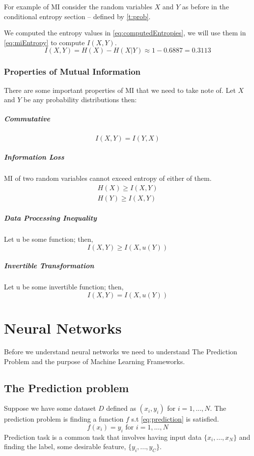 \documentclass[dissertation.tex]{subfiles}
\begin{document}
For example of MI consider the random variables $X$ and $Y$ as
before in the conditional entropy section -- defined by \autoref{t:prob}. 

We computed the entropy values in \autoref{eq:computedEntropies}, we will use
them in \autoref{eq:miEntropy} to compute $I(X,Y)$.
\begin{equation}
  I(X,Y) = H(X) - H(X|Y) \approx 1 - 0.6887 = 0.3113
\end{equation}

\subsubsection{Properties of Mutual Information}
There are some important properties of MI that we need to take note of. Let $X$
and $Y$ be any probability distributions then:

\subparagraph{Commutative} 
\begin{equation}
  I(X,Y) = I(Y, X)
\end{equation}
\subparagraph{Information Loss} MI of two random variables cannot exceed entropy
of either of them.
\begin{align}
  H(X) \geq I(X,Y) \nonumber \\
  H(Y) \geq I(X,Y)
  \label{eq:MIloss}
\end{align}
\subparagraph{Data Processing Inequality} Let u be some function; then,
\begin{equation}
  I(X,Y) \geq I(X, u(Y))
\end{equation}
\subparagraph{Invertible Transformation} Let u be some invertible function;
then,
\begin{equation}
  I(X, Y) = I(X, u(Y))
\end{equation}

\section{Neural Networks}
\label{sec:NN}

Before we understand neural networks we need to understand The Prediction
Problem and the purpose of Machine Learning Frameworks.

\subsection{The Prediction problem} 

Suppose we have some dataset $D$ defined as $(x_i, y_i)$ for $i = 1,...,N$. The
prediction problem is finding a function $f$ s.t \autoref{eq:prediction} is
satisfied.
\begin{equation}
  f(x_i) = y_i \text{ for } i = 1,...,N
  \label{eq:prediction}
\end{equation}
Prediction task is a common task that involves having input data
$\{x_i,...,x_N\}$ and finding the label, some desirable feature,
$\{y_i,...,y_C\}$. 
\end{document}
